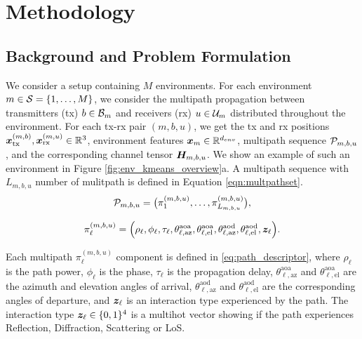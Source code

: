 \section{Methodology}

\subsection{Background and Problem Formulation}\label{subsec:problem_formulation}
We consider a setup containing $M$ environments. For each environment $m \in \mathcal{S} = \{1,\dots,M\}$, we consider the multipath propagation between transmitters (tx) $b \in \mathcal{B}_m$ and receivers (rx) $u \in \mathcal{U}_m$ distributed throughout the environment.  For each tx-rx pair $(m,b,u)$, we get the tx and rx positions $\boldsymbol{x}_{\mathrm{tx}}^{(m,b)}, \boldsymbol{x}_{\mathrm{rx}}^{(m,u)}  \in \mathbb{R}^3$, environment features $\boldsymbol{x}_{m} \in \mathbb{R}^{d_{env}}$,  multipath sequence $\mathcal{P}_{m,b,u}$, and the corresponding channel tensor $\boldsymbol{H}_{m,b,u}$.  We show an example of such an environment in Figure \ref{fig:env_kmeans_overview}{a}.  A multipath sequence 
 with $L_{m,b,u}$ number of mulitpath is defined in Equation \ref{eqn:multpathset}. 
\begin{equation}
\mathcal{P}_{m,b,u} = \big(\pi^{(m,b,u)}_1,\ldots,\pi^{(m,b,u)}_{L_{m,b,u}}\big),
\label{eqn:multpathset}
\end{equation}

\begin{equation}
\pi^{(m,b,u)}_\ell = \Big(\rho_\ell, \phi_\ell, \tau_\ell, \theta^{\mathrm{aoa}}_{\ell,\mathrm{az}}, \theta^{\mathrm{aoa}}_{\ell,\mathrm{el}}, \theta^{\mathrm{aod}}_{\ell,\mathrm{az}}, \theta^{\mathrm{aod}}_{\ell,\mathrm{el}}, \boldsymbol{z}_\ell\Big).
\label{eq:path_descriptor}
\end{equation}

Each multipath $\pi^{(m,b,u)}_\ell$ component is defined in \ref{eq:path_descriptor}, where $\rho_\ell$ is the path power, $\phi_\ell$ is the phase, $\tau_\ell$ is the propagation delay, $\theta^{\mathrm{aoa}}_{\ell,\mathrm{az}}$ and $\theta^{\mathrm{aoa}}_{\ell,\mathrm{el}}$ are the azimuth and elevation angles of arrival, $\theta^{\mathrm{aod}}_{\ell,\mathrm{az}}$ and $\theta^{\mathrm{aod}}_{\ell,\mathrm{el}}$ are the corresponding angles of departure, and $\boldsymbol{z}_\ell$ is an interaction type experienced by the path. The interaction type $\boldsymbol{z}_\ell \in  \{0,1\}^4 $ is a multihot vector showing if the path experiences Reflection, Diffraction, Scattering or LoS.

